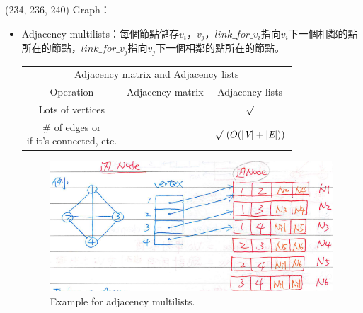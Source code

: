 \item \begin{theorem}{(234, 236, 240)} Graph：\begin{itemize}
        \item Adjacency multilists：每個節點儲存$v_i$，$v_j$，$link\_for\_v_i$指向$v_i$下一個相鄰的點所在的節點，$link\_for\_v_j$指向$v_j$下一個相鄰的點所在的節點。%
        \begin{table}[H]
            \centering
            \begin{tabular}{|c|c|c|}
                \hline
                \multicolumn{3}{|c|}{Adjacency matrix and Adjacency lists} \\
                \Xhline{3\arrayrulewidth}
                Operation & Adjacency matrix & Adjacency lists \\
                \Xhline{2\arrayrulewidth}
                Lots of vertices & & $\surd$ \\
                \hline
                \makecell{\# of edges or \\if it's connected, etc.} & & $\surd \ (O(|\V| + |\E|))$ \\
                \hline
            \end{tabular}
        \end{table}
        \begin{figure}[H]
            \centering
            \includegraphics[scale=0.8]{img/adj_multilists.png}
            \caption{Example for adjacency multilists.}
            \label{img:adj_multilists}
        \end{figure}
    \end{itemize}
\end{theorem}

